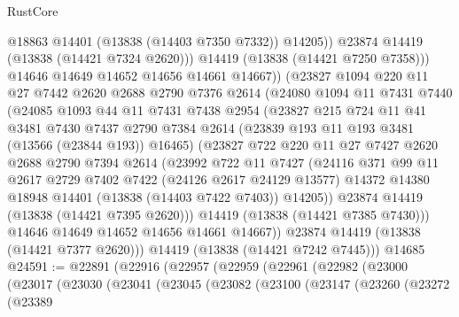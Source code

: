 \begin{lexlean}{RustCore}
\begin{coremodule}
                  @18863
                  @14401
                  (@13838 (@14403 @7350 @7332))
                  @14205))
              @23874
              @14419
              (@13838 (@14421 @7324 @2620)))
            @14419
            (@13838 (@14421 @7250 @7358)))
          @14646
          @14649
          @14652
          @14656
          @14661
          @14667))
      (@23827
        @1094
        @220
        @11
        @27
        @7442
        @2620
        @2688
        @2790
        @7376
        @2614
        (@24080
          @1094
          @11
          @7431
          @7440
          (@24085
            @1093
            @44
            @11
            @7431
            @7438
            @2954
            (@23827
              @215
              @724
              @11
              @41
              @3481
              @7430
              @7437
              @2790
              @7384
              @2614
              (@23839 @193 @11 @193 @3481 (@13566 (@23844 @193)) @16465)
              (@23827
                @722
                @220
                @11
                @27
                @7427
                @2620
                @2688
                @2790
                @7394
                @2614
                (@23992
                  @722
                  @11
                  @7427
                  (@24116
                    @371
                    @99
                    @11
                    @2617
                    @2729
                    @7402
                    @7422
                    (@24126 @2617 @24129 @13577)
                    @14372
                    @14380
                    @18948
                    @14401
                    (@13838 (@14403 @7422 @7403))
                    @14205))
                @23874
                @14419
                (@13838 (@14421 @7395 @2620)))
              @14419
              (@13838 (@14421 @7385 @7430)))
            @14646
            @14649
            @14652
            @14656
            @14661
            @14667))
        @23874
        @14419
        (@13838 (@14421 @7377 @2620)))
      @14419
      (@13838 (@14421 @7242 @7445)))
    @14685
@24591 := @22891
    (@22916
      (@22957
        (@22959
          (@22961
            (@22982
              (@23000
                (@23017
                  (@23030
                    (@23041
                      (@23045
                        (@23082
                          (@23100
                            (@23147
                              (@23260
                                (@23272
                                  (@23389

\end{coremodule}
\end{lexlean}
